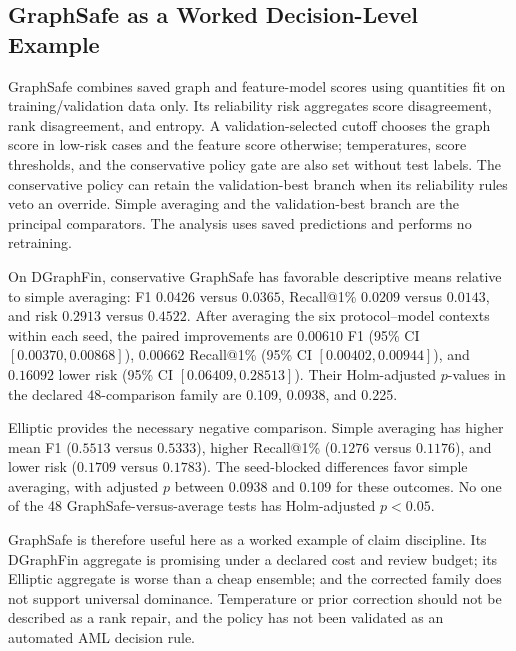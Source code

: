 \subsection{GraphSafe as a Worked Decision-Level Example}

GraphSafe combines saved graph and feature-model scores using quantities fit on training/validation data only. Its reliability risk aggregates score disagreement, rank disagreement, and entropy. A validation-selected cutoff chooses the graph score in low-risk cases and the feature score otherwise; temperatures, score thresholds, and the conservative policy gate are also set without test labels. The conservative policy can retain the validation-best branch when its reliability rules veto an override. Simple averaging and the validation-best branch are the principal comparators. The analysis uses saved predictions and performs no retraining.



On DGraphFin, conservative GraphSafe has favorable descriptive means relative to simple averaging: F1 $0.0426$ versus $0.0365$, Recall@1\% $0.0209$ versus $0.0143$, and risk $0.2913$ versus $0.4522$. After averaging the six protocol--model contexts within each seed, the paired improvements are $0.00610$ F1 (95\% CI $[0.00370,0.00868]$), $0.00662$ Recall@1\% (95\% CI $[0.00402,0.00944]$), and $0.16092$ lower risk (95\% CI $[0.06409,0.28513]$). Their Holm-adjusted $p$-values in the declared 48-comparison family are 0.109, 0.0938, and 0.225.

Elliptic provides the necessary negative comparison. Simple averaging has higher mean F1 ($0.5513$ versus $0.5333$), higher Recall@1\% ($0.1276$ versus $0.1176$), and lower risk ($0.1709$ versus $0.1783$). The seed-blocked differences favor simple averaging, with adjusted $p$ between 0.0938 and 0.109 for these outcomes. No one of the 48 GraphSafe-versus-average tests has Holm-adjusted $p<0.05$.

GraphSafe is therefore useful here as a worked example of claim discipline. Its DGraphFin aggregate is promising under a declared cost and review budget; its Elliptic aggregate is worse than a cheap ensemble; and the corrected family does not support universal dominance. Temperature or prior correction should not be described as a rank repair, and the policy has not been validated as an automated AML decision rule.
